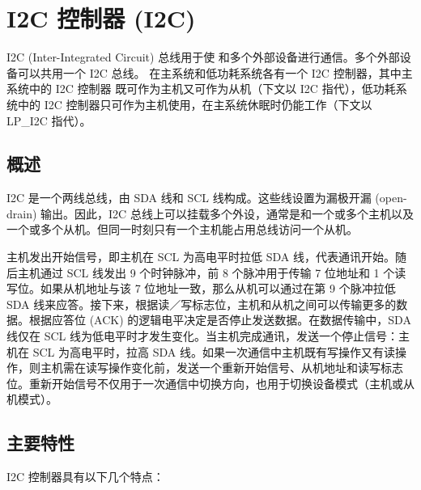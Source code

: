\documentclass[main\_\_CN.tex]{subfiles}
\begin{document}

\ifglobal
\else
    {\let\clearpage\relax \listoftodos}
    {\let\clearpage\relax \listofdonetodos}
    \tableofcontents
\fi



\hypertarget{i2c}{}
\chapter{I2C 控制器 (I2C)}
\label{mod:i2c}

I2C (Inter-Integrated Circuit) 总线用于使 \chipname{} 和多个外部设备进行通信。多个外部设备可以共用一个 I2C 总线。 
\chipname{} 在主系统和低功耗系统各有一个 I2C 控制器，其中主系统中的 I2C 控制器 既可作为主机又可作为从机（下文以 I2C 指代），低功耗系统中的 I2C 控制器只可作为主机使用，在主系统休眠时仍能工作（下文以 LP\_I2C 指代）。


\section{概述}
I2C 是一个两线总线，由 SDA 线和 SCL 线构成。这些线设置为漏极开漏 (open-drain) 输出。因此，I2C 总线上可以挂载多个外设，通常是和一个或多个主机以及一个或多个从机。但同一时刻只有一个主机能占用总线访问一个从机。

主机发出开始信号，即主机在 SCL 为高电平时拉低 SDA 线，代表通讯开始。随后主机通过 SCL 线发出 9 个时钟脉冲，前 8 个脉冲用于传输 7 位地址和 1 个读写位。如果从机地址与该 7 位地址一致，那么从机可以通过在第 9 个脉冲拉低 SDA 线来应答。接下来，根据读／写标志位，主机和从机之间可以传输更多的数据。根据应答位 (ACK) 的逻辑电平决定是否停止发送数据。在数据传输中，SDA 线仅在 SCL 线为低电平时才发生变化。当主机完成通讯，发送一个停止信号：主机在 SCL 为高电平时，拉高 SDA 线。如果一次通信中主机既有写操作又有读操作，则主机需在读写操作变化前，发送一个重新开始信号、从机地址和读写标志位。重新开始信号不仅用于一次通信中切换方向，也用于切换设备模式（主机或从机模式）。

\section{主要特性}

\chipname{} I2C 控制器具有以下几个特点：
\end{document}
